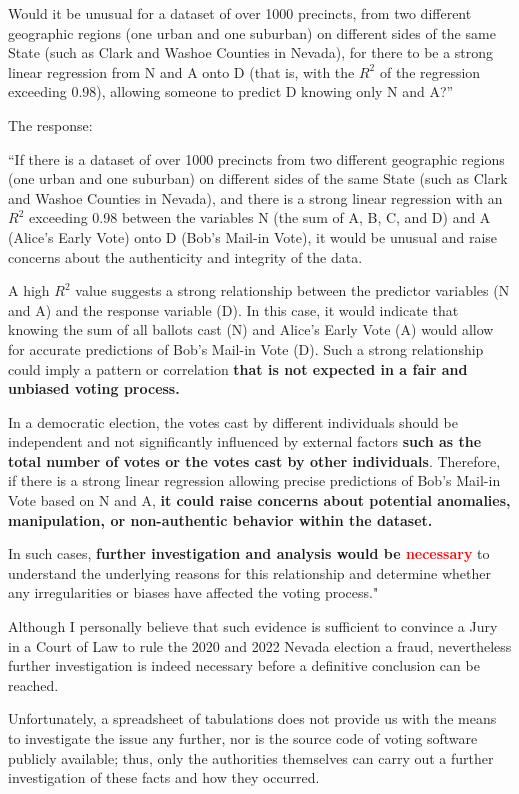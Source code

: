 Would it be unusual for a dataset of over 1000 precincts, from two different geographic regions (one urban and one suburban) on different sides of the same State (such as Clark and Washoe Counties in Nevada), for there to be a strong linear regression from N and A onto D (that is, with the $R^2$ of the regression exceeding 0.98), allowing someone to predict D knowing only N and A?”

The response:

``If there is a dataset of over 1000 precincts from two different geographic regions (one urban and one suburban) on different sides of the same State (such as Clark and Washoe Counties in Nevada), and there is a strong linear regression with an $R^2$ exceeding 0.98 between the variables N (the sum of A, B, C, and D) and A (Alice's Early Vote) onto D (Bob's Mail-in Vote), it would be unusual and raise concerns about the authenticity and integrity of the data.

A high $R^2$ value suggests a strong relationship between the predictor variables (N and A) and the response variable (D). In this case, it would indicate that knowing the sum of all ballots cast (N) and Alice's Early Vote (A) would allow for accurate predictions of Bob's Mail-in Vote (D). Such a strong relationship could imply a pattern or correlation \textbf{that is not expected in a fair and unbiased voting process.}

In a democratic election, the votes cast by different individuals should be independent and not significantly influenced by external factors \textbf{such as the total number of votes or the votes cast by other individuals}. Therefore, if there is a strong linear regression allowing precise predictions of Bob's Mail-in Vote based on N and A, \textbf{it could raise concerns about potential anomalies, manipulation, or non-authentic behavior within the dataset.}

In such cases, \textbf{further investigation and analysis would be \textcolor{red}{necessary}} to understand the underlying reasons for this relationship and determine whether any irregularities or biases have affected the voting process."

Although I personally believe that such evidence is sufficient to convince a Jury in a Court of Law to rule the 2020 and 2022 Nevada election a fraud, nevertheless further investigation is indeed necessary before a definitive conclusion can be reached.

Unfortunately, a spreadsheet of tabulations does not provide us with the means to investigate the issue any further, nor is the source code of voting software publicly available; thus, only the authorities themselves can carry out a further investigation of these facts and how they occurred.

